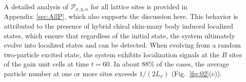 \documentclass[longbibliography, aps, prx, amsmath, amssymb, amsfonts, twocolumn,superscriptaddress, footinbib]{revtex4-1}
\begin{document}
	A detailed analysis of $\mathcal{P}_{x,y,\alpha}$ for all lattice sites is provided in Appendix~\ref{sec:AllP}, which also supports the discussion here. 
	This behavior is attributed to the presence of hybrid chiral skin-many body induced localized states, which ensure that regardless of the initial state, the system ultimately evolve into localized states and can be detected.
	When evolving from a random two-particle excited state, the system exhibits localization signals at the $B$ sites of the gain unit cells at time $t=60$.
	In about $88\%$ of the cases, the average particle number at one or more sites exceeds $1/(2L_x)$ (Fig.~\ref{fig:02}(c)).

\end{document}
